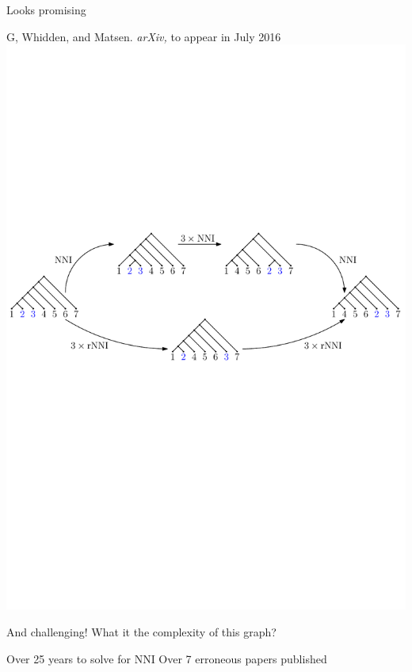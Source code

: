 \documentclass{beamer}
\theoremstyle{example}
\begin{document}
\begin{frame}{Looks promising}
\begin{block}{G, Whidden, and Matsen. \emph{arXiv,} to appear in July 2016}
\includegraphics[width = \framewidth]{NNI_VS_rNNI}
\end{block}

\pause

\begin{block}{And challenging!}
What it the complexity of this graph?
\end{block}

\begin{outline}
\1 Over 25 years to solve for NNI
\1 Over 7 erroneous papers published
\end{outline}

\end{frame}
\end{document}
